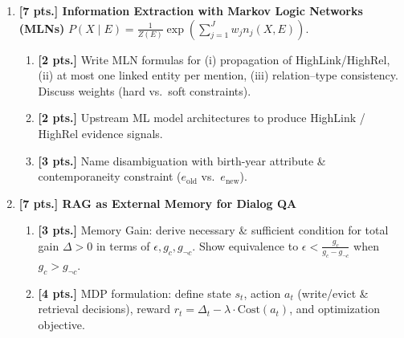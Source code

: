 \documentclass[11pt,a4paper]{article}
\begin{document}
\begin{enumerate}[label=\textbf{(\arabic*)}]
    \item \textbf{[7 pts.] Information Extraction with Markov Logic Networks (MLNs)}
    $P(X \mid E) = \frac{1}{Z(E)} \exp\left( \sum_{j=1}^J w_j n_j(X, E) \right)$.
    \begin{enumerate}[label=(\a*)]
        \item \textbf{[2 pts.]} Write MLN formulas for (i) propagation of HighLink/HighRel, (ii) at most one linked entity per mention, (iii) relation--type consistency. Discuss weights (hard vs.\ soft constraints).
        \item \textbf{[2 pts.]} Upstream ML model architectures to produce HighLink / HighRel evidence signals.
        \item \textbf{[3 pts.]} Name disambiguation with birth-year attribute \& contemporaneity constraint ($e_{\text{old}}$ vs.\ $e_{\text{new}}$).
    \end{enumerate}

    \item \textbf{[7 pts.] RAG as External Memory for Dialog QA}
    \begin{enumerate}[label=(\a*)]
        \item \textbf{[3 pts.]} Memory Gain: derive necessary \& sufficient condition for total gain $\Delta > 0$ in terms of $\epsilon, g_c, g_{\neg c}$. Show equivalence to $\epsilon < \frac{g_c}{g_c - g_{\neg c}}$ when $g_c > g_{\neg c}$.
        \item \textbf{[4 pts.]} MDP formulation: define state $s_t$, action $a_t$ (write/evict \& retrieval decisions), reward $r_t = \Delta_t - \lambda \cdot \text{Cost}(a_t)$, and optimization objective.
    \end{enumerate}
\end{enumerate}
\end{document}
